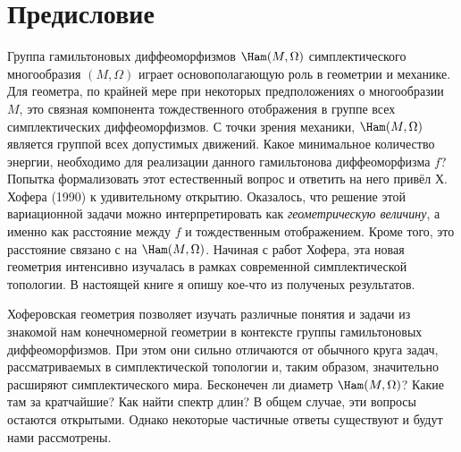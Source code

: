 \chapter*{Предисловие}

Группа гамильтоновых диффеоморфизмов $\Ham(M,\Omega)$ симплектического
многообразия $(M,\Omega)$ играет
основополагающую роль в геометрии и
механике.  Для геометра, по крайней мере при некоторых предположениях
о многообразии $M$, это связная компонента тождественного отображения
в группе всех симплектических диффеоморфизмов.  С точки зрения
механики, $\Ham(M,\Omega)$ является группой всех допустимых движений.
Какое минимальное количество энергии, необходимо для реализации
данного гамильтонова диффеоморфизма $f$?  Попытка формализовать этот
естественный вопрос и ответить на него привёл Х. Хофера \cite{H1}
(1990) к удивительному открытию.  Оказалось, что решение этой
вариационной задачи можно интерпретировать как \emph{геометрическую
  величину}, а именно как расстояние между $f$ и тождественным
отображением.  Кроме того, это расстояние связано с  на $\Ham(M,\Omega)$.  Начиная с работ
Хофера, эта новая геометрия интенсивно изучалась в рамках современной
симплектической топологии.  В настоящей книге я опишу кое-что из
полученых результатов.

Хоферовская геометрия позволяет изучать различные понятия и задачи из знакомой нам конечномерной геометрии в контексте группы гамильтоновых диффеоморфизмов.
При этом они сильно отличаются от обычного круга задач, рассматриваемых в симплектической топологии и, таким образом, значительно расширяют  симплектического мира.
Бесконечен ли диаметр $\Ham(M,\Omega)$?
Какие там за кратчайшие?
Как найти спектр длин?
В общем случае, эти вопросы остаются открытыми.
Однако некоторые частичные ответы существуют и будут нами рассмотрены.

